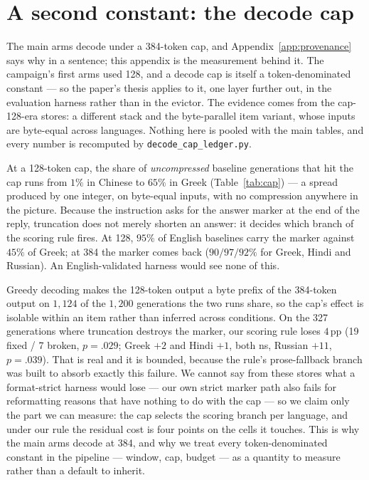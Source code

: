 \documentclass{article}
\begin{document}
\section{A second constant: the decode cap}
\label{app:cap}

The main arms decode under a 384-token cap, and
Appendix~\ref{app:provenance} says why in a sentence; this appendix is the
measurement behind it. The campaign's first arms used 128, and a decode
cap is itself a token-denominated constant --- so the paper's thesis
applies to it, one layer further out, in the evaluation harness rather
than in the evictor. The evidence comes from the cap-128-era stores: a
different stack and the byte-parallel item variant, whose inputs are
byte-equal across languages. Nothing here is pooled with the main tables,
and every number is recomputed by \texttt{decode\_cap\_ledger.py}.

At a 128-token cap, the share of \emph{uncompressed} baseline generations
that hit the cap runs from $1\%$ in Chinese to $65\%$ in Greek
(Table~\ref{tab:cap}) --- a spread produced by one integer, on byte-equal
inputs, with no compression anywhere in the picture. Because the
instruction asks for the answer marker at the end of the reply,
truncation does not merely shorten an answer: it decides which branch of
the scoring rule fires. At 128, $95\%$ of English baselines carry the
marker against $45\%$ of Greek; at 384 the marker comes back
($90/97/92\%$ for Greek, Hindi and Russian). An English-validated harness
would see none of this.

Greedy decoding makes the 128-token output a byte prefix of the 384-token
output on $1{,}124$ of the $1{,}200$ generations the two runs share, so
the cap's effect is isolable within an item rather than inferred across
conditions. On the 327 generations where truncation destroys the marker,
our scoring rule loses $4$\,pp (19 fixed / 7 broken, $p{=}.029$;
Greek $+2$ and Hindi $+1$, both ns, Russian $+11$, $p{=}.039$). That is
real and it is bounded, because the rule's prose-fallback branch was
built to absorb exactly this failure. We cannot say from these stores
what a format-strict harness would lose --- our own strict marker path
also fails for reformatting reasons that have nothing to do with the cap
--- so we claim only the part we can measure: the cap selects the scoring
branch per language, and under our rule the residual cost is four points
on the cells it touches. This is why the main arms decode at 384, and why
we treat every token-denominated constant in the pipeline --- window,
cap, budget --- as a quantity to measure rather than a default to
inherit.
\end{document}

